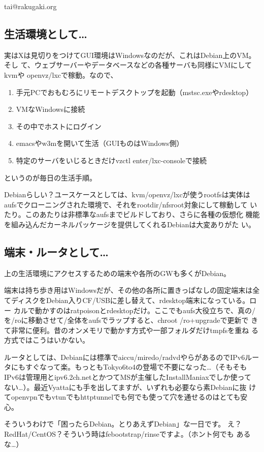 \begin{prework} {tai@rakugaki.org}
 \subsection{生活環境として…}
 実はXは見切りをつけてGUI環境はWindowsなのだが、これはDebian上のVM。そし
 て、ウェブサーバーやデータベースなどの各種サーバも同様にVMにしてkvmや
 openvz/lxcで稼動。なので、

 \begin{enumerate}
  \item 手元PCでおもむろにリモートデスクトップを起動（mstsc.exeやrdesktop）
  \item VMなWindowsに接続
  \item その中でホストにログイン
  \item emacsやw3mを開いて生活（GUIものはWindows側）
  \item 特定のサーバをいじるときだけvzctl enter/lxc-consoleで接続
 \end{enumerate}
 というのが毎日の生活手順。

 Debianらしい？ユースケースとしては、kvm/openvz/lxcが使うrootfsは実体は
 aufsでクローニングされた環境で、それをrootdir/nfsroot対象にして稼動して
 いたり。このあたりは非標準なaufsまでビルドしており、さらに各種の仮想化
 機能を組み込んだカーネルパッケージを提供してくれるDebianは大変ありがた
 い。

 \subsection{端末・ルータとして…}
 上の生活環境にアクセスするための端末や各所のGWも多くがDebian。

 端末は持ち歩き用はWindowsだが、その他の各所に置きっぱなしの固定端末は全
 てディスクをDebian入りCF/USBに差し替えて、rdesktop端末になっている。ロー
 カルで動かすのはratpoisonとrdesktopだけ。ここでもaufs大役立ちで、真の/
 を/roに移動させて/全体をaufsでラップすると、chroot /ro+upgradeで更新で
 きて非常に便利。昔のオンメモリで動かす方式や一部フォルダだけtmpfsを重ね
 る方式ではこうはいかない。

 ルータとしては、Debianには標準でaiccu/miredo/radvdやらがあるのでIPv6ルー
 タにもすぐなって楽。もっともTokyo6to4の登場で不要になった…（そもそも
 IPv6は管理用とipv6.2ch.netとかつてMSが主催したInstallManiaxでしか使って
 ない…）。最近Vyattaにも手を出してますが、いずれも必要なら素Debianに抜
 けてopenvpnでもvtunでもhttptunnelでも何でも使って穴を通せるのはとても安
 心。

 そういうわけで「困ったらDebian。とりあえずDebian」な一日です。
 え？RedHat/CentOS？そういう時はfebootstrap/rinseですよ。（ホント何でも
 あるな…）
\end{prework}

